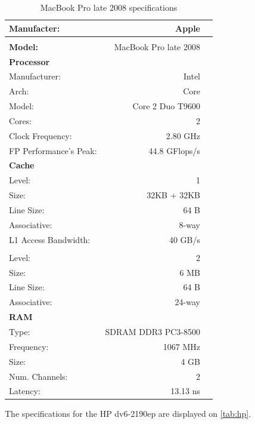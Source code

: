 \documentclass[a4paper,10pt,openright,openbib,twocolumn]{article}
\begin{document}
\tabcolsep=0.11cm
\begin{table}[!htp]
	\footnotesize
		\begin{tabular}{lrl}
			\hline 
			\textbf{Manufacter:} & Apple \\
			\hline \\
			\textbf{Model:} & MacBook Pro late 2008 \\
			\hline 
			\textbf{Processor} & & \\
			Manufacturer: & Intel & \\
			Arch: & Core & \\
			Model: & Core 2 Duo T9600 & \\
			Cores: & 2 & \\
			Clock Frequency: & 2.80 GHz & \\
			FP Performance's Peak: & 44.8 GFlops/s & \\
			\hline 
			\textbf{Cache} & & \\
			Level: & 1 & \\
			Size: & 32KB + 32KB & \\
			Line Size: & 64 B & \\
			Associative: & 8-way & \\			
			L1 Access Bandwidth: & 40 GB/s & \\
			\\
			Level: & 2 & \\
			Size: & 6 MB & \\
			Line Size: & 64 B & \\
			Associative: & 24-way & \\
			\hline 
			\textbf{RAM} \\
			Type: & SDRAM DDR3 PC3-8500 & \\
			Frequency: & 1067 MHz & \\
			Size: & 4 GB & \\
			Num. Channels: & 2 & \\
			Latency: & 13.13 ns & \\
		\end{tabular}
		\caption{MacBook Pro late 2008 specifications}
		\label{tab:mbp}
\end{table}
The specifications for the HP dv6-2190ep are displayed on \autoref{tab:hp}. \\
\end{document}
